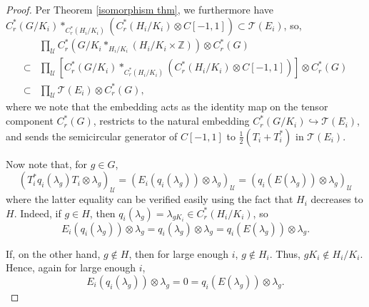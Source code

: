 \documentclass[10pt]{amsart}
\theoremstyle{definition}
\newcommand{\Z}{\ensuremath{\mathbb{Z}}}
\newcommand{\cU}{\ensuremath{\mathcal{U}}}
\newcommand{\cT}{\ensuremath{\mathcal{T}}}
\begin{document}
\begin{proof}
    Per Theorem \ref{isomorphism thm}, we furthermore have $C_r^\ast(G/K_i) \ast_{C_r^\ast(H_i/K_i)} (C_r^\ast(H_i/K_i) \otimes C[-1,1]) \subset \cT(E_i)$, so,
    \begin{equation}\label{eqn: embedding 2}
    \begin{split}
        &\prod_\cU C_r^\ast(G/K_i \ast_{H_i/K_i} (H_i/K_i\times\Z)) \otimes C_r^\ast(G)\\
        \subset &\prod_\cU [C_r^\ast(G/K_i) \ast_{C_r^\ast(H_i/K_i)} (C_r^\ast(H_i/K_i) \otimes C[-1,1])] \otimes C_r^\ast(G)\\
        \subset &\prod_\cU \cT(E_i) \otimes C_r^\ast(G),
    \end{split}
    \end{equation}
    where we note that the embedding acts as the identity map on the tensor component $C_r^\ast(G)$, restricts to the natural embedding $C_r^\ast(G/K_i) \hookrightarrow \cT(E_i)$, and sends the semicircular generator of $C[-1, 1]$ to $\frac{1}{2}(T_i + T_i^\ast)$ in $\cT(E_i)$.
    
    Now note that, for $g \in G$,
    \begin{equation*}
        (T_i^\ast q_i(\lambda_g)T_i \otimes \lambda_g)_\cU = (E_i(q_i(\lambda_g)) \otimes \lambda_g)_\cU = (q_i(E(\lambda_g)) \otimes \lambda_g)_\cU
    \end{equation*}
    where the latter equality can be verified easily using the fact that $H_i$ decreases to $H$. Indeed, if $g \in H$, then $q_i(\lambda_g) = \lambda_{gK_i} \in C_r^\ast(H_i/K_i)$, so
    \begin{equation*}
        E_i(q_i(\lambda_g)) \otimes \lambda_g = q_i(\lambda_g) \otimes \lambda_g = q_i(E(\lambda_g)) \otimes \lambda_g.
    \end{equation*}

    If, on the other hand, $g \notin H$, then for large enough $i$, $g \notin H_i$. Thus, $gK_i \notin H_i/K_i$. Hence, again for large enough $i$,
    \begin{equation*}
        E_i(q_i(\lambda_g)) \otimes \lambda_g = 0 = q_i(E(\lambda_g)) \otimes \lambda_g.
    \end{equation*}
    

\end{proof}
\end{document}
